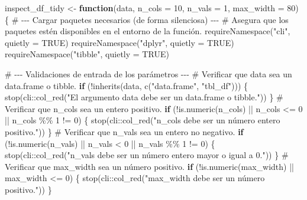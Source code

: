 \documentclass[
  letterpaper,
  DIV=11,
  numbers=noendperiod]{scrartcl}
\newenvironment{Shaded}{\begin{snugshade}}{\end{snugshade}}
\newcommand{\AttributeTok}[1]{\textcolor[rgb]{0.40,0.45,0.13}{#1}}
\newcommand{\CommentTok}[1]{\textcolor[rgb]{0.37,0.37,0.37}{#1}}
\newcommand{\ConstantTok}[1]{\textcolor[rgb]{0.56,0.35,0.01}{#1}}
\newcommand{\ControlFlowTok}[1]{\textcolor[rgb]{0.00,0.23,0.31}{\textbf{#1}}}
\newcommand{\DecValTok}[1]{\textcolor[rgb]{0.68,0.00,0.00}{#1}}
\newcommand{\FunctionTok}[1]{\textcolor[rgb]{0.28,0.35,0.67}{#1}}
\newcommand{\NormalTok}[1]{\textcolor[rgb]{0.00,0.23,0.31}{#1}}
\newcommand{\OtherTok}[1]{\textcolor[rgb]{0.00,0.23,0.31}{#1}}
\newcommand{\SpecialCharTok}[1]{\textcolor[rgb]{0.37,0.37,0.37}{#1}}
\newcommand{\StringTok}[1]{\textcolor[rgb]{0.13,0.47,0.30}{#1}}
\begin{document}
\begin{Shaded}
\begin{Highlighting}[]
\NormalTok{inspect\_df\_tidy }\OtherTok{\textless{}{-}} \ControlFlowTok{function}\NormalTok{(data, }\AttributeTok{n\_cols =} \DecValTok{10}\NormalTok{, }\AttributeTok{n\_vals =} \DecValTok{1}\NormalTok{, }\AttributeTok{max\_width =} \DecValTok{80}\NormalTok{) \{}
  \CommentTok{\# {-}{-}{-} Cargar paquetes necesarios (de forma silenciosa) {-}{-}{-}}
  \CommentTok{\# Asegura que los paquetes estén disponibles en el entorno de la función.}
  \FunctionTok{requireNamespace}\NormalTok{(}\StringTok{"cli"}\NormalTok{, }\AttributeTok{quietly =} \ConstantTok{TRUE}\NormalTok{)}
  \FunctionTok{requireNamespace}\NormalTok{(}\StringTok{"dplyr"}\NormalTok{, }\AttributeTok{quietly =} \ConstantTok{TRUE}\NormalTok{)}
  \FunctionTok{requireNamespace}\NormalTok{(}\StringTok{"tibble"}\NormalTok{, }\AttributeTok{quietly =} \ConstantTok{TRUE}\NormalTok{)}
  
  \CommentTok{\# {-}{-}{-} Validaciones de entrada de los parámetros {-}{-}{-}}
  \CommentTok{\# Verificar que \textquotesingle{}data\textquotesingle{} sea un data.frame o tibble.}
  \ControlFlowTok{if}\NormalTok{ (}\SpecialCharTok{!}\FunctionTok{inherits}\NormalTok{(data, }\FunctionTok{c}\NormalTok{(}\StringTok{"data.frame"}\NormalTok{, }\StringTok{"tbl\_df"}\NormalTok{))) \{}
    \FunctionTok{stop}\NormalTok{(cli}\SpecialCharTok{::}\FunctionTok{col\_red}\NormalTok{(}\StringTok{"El argumento \textquotesingle{}data\textquotesingle{} debe ser un data.frame o tibble."}\NormalTok{))}
\NormalTok{  \}}
  \CommentTok{\# Verificar que \textquotesingle{}n\_cols\textquotesingle{} sea un entero positivo.}
  \ControlFlowTok{if}\NormalTok{ (}\SpecialCharTok{!}\FunctionTok{is.numeric}\NormalTok{(n\_cols) }\SpecialCharTok{||}\NormalTok{ n\_cols }\SpecialCharTok{\textless{}=} \DecValTok{0} \SpecialCharTok{||}\NormalTok{ n\_cols }\SpecialCharTok{\%\%} \DecValTok{1} \SpecialCharTok{!=} \DecValTok{0}\NormalTok{) \{}
    \FunctionTok{stop}\NormalTok{(cli}\SpecialCharTok{::}\FunctionTok{col\_red}\NormalTok{(}\StringTok{"\textquotesingle{}n\_cols\textquotesingle{} debe ser un número entero positivo."}\NormalTok{))}
\NormalTok{  \}}
  \CommentTok{\# Verificar que \textquotesingle{}n\_vals\textquotesingle{} sea un entero no negativo.}
  \ControlFlowTok{if}\NormalTok{ (}\SpecialCharTok{!}\FunctionTok{is.numeric}\NormalTok{(n\_vals) }\SpecialCharTok{||}\NormalTok{ n\_vals }\SpecialCharTok{\textless{}} \DecValTok{0} \SpecialCharTok{||}\NormalTok{ n\_vals }\SpecialCharTok{\%\%} \DecValTok{1} \SpecialCharTok{!=} \DecValTok{0}\NormalTok{) \{}
    \FunctionTok{stop}\NormalTok{(cli}\SpecialCharTok{::}\FunctionTok{col\_red}\NormalTok{(}\StringTok{"\textquotesingle{}n\_vals\textquotesingle{} debe ser un número entero mayor o igual a 0."}\NormalTok{))}
\NormalTok{  \}}
  \CommentTok{\# Verificar que \textquotesingle{}max\_width\textquotesingle{} sea un número positivo.}
  \ControlFlowTok{if}\NormalTok{ (}\SpecialCharTok{!}\FunctionTok{is.numeric}\NormalTok{(max\_width) }\SpecialCharTok{||}\NormalTok{ max\_width }\SpecialCharTok{\textless{}=} \DecValTok{0}\NormalTok{) \{}
    \FunctionTok{stop}\NormalTok{(cli}\SpecialCharTok{::}\FunctionTok{col\_red}\NormalTok{(}\StringTok{"\textquotesingle{}max\_width\textquotesingle{} debe ser un número positivo."}\NormalTok{))}
\NormalTok{  \}}
  

\end{Highlighting}
\end{Shaded}
\end{document}
